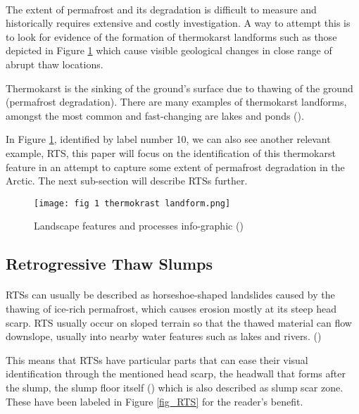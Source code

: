 \paragraph{}
The extent of permafrost and its degradation is difficult to measure and historically requires extensive and costly investigation. A way to attempt this is to look for evidence of the formation of thermokarst landforms such as those depicted in Figure \ref{fig_thermokrast} which cause visible geological changes in close range of abrupt thaw locations.

Thermokarst is the sinking of the ground's surface due to thawing of the ground (permafrost degradation). There are many examples of thermokarst landforms, amongst the most common and fast-changing are lakes and ponds (\cite{thawpic}).

In Figure \ref{fig_thermokrast}, identified by label number 10, we can also see another relevant example, \gls{RTS}, this paper will focus on the identification of this thermokarst feature in an attempt to capture some extent of permafrost degradation in the Arctic. The next sub-section will describe \gls{RTS}s further.

    \begin{figure}[hbt!]
        \centering
        \texttt{[image: fig 1 thermokrast landform.png]}
        \caption{Landscape features and processes info-graphic (\cite{rs13061217})}
        \label{fig_thermokrast}
    \end{figure}



\subsection{Retrogressive Thaw Slumps}  \label{rts_intro}

\paragraph{}
\gls{RTS}s can usually be described as horseshoe-shaped landslides caused by the thawing of ice-rich permafrost, which causes erosion mostly at its steep head scarp. \gls{RTS} usually occur on sloped terrain so that the thawed material can flow downslope, usually into nearby water features such as lakes and rivers. (\cite{articleperma})
 
This means that \gls{RTS}s have particular parts that can ease their visual identification through the mentioned head scarp, the headwall that forms after the slump, the slump floor itself (\cite{LANTUIT200884}) which is also described as slump scar zone. These have been labeled in Figure \ref{fig_RTS} for the reader's benefit. 

